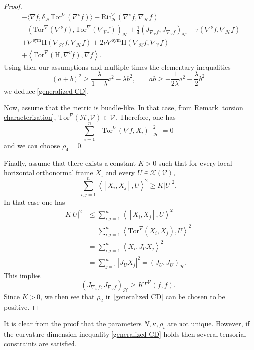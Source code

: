 \documentclass[11pt]{article}
\numberwithin{equation}{section}
\newcommand{\Ho}{\mathcal H}
\newcommand{\V}{\mathcal V}
\newcommand{\Tor}{\mathrm{Tor}}
\begin{document}
\begin{proof}
\begin{align*}
		&- \langle \nabla f, \delta_\Ho \mathrm{Tor}^\nabla ( \nabla^\nu f ) \rangle+\mathrm{Ric}_\Ho^\nabla(\nabla^\nu f, \nabla_{\mathcal{H}} f )\\
		&-(\mathrm{Tor}^\nabla (\nabla^\nu f),\mathrm{Tor}^\nabla (\nabla_\V f) )_\Ho+\frac{1}{4}( J_{\nabla_\V f} , J_{\nabla_\V f} )_\Ho-\tau (\nabla^\nu f,\nabla_\Ho f) \\
        &+ \nabla^{\mathrm{sym}}\mathrm H(\nabla_\Ho f,\nabla_\Ho f)+2\nu \nabla^{\mathrm{sym}}\mathrm H(\nabla_\Ho f,\nabla_\V f) \\
        &+\left\langle \mathrm{Tor}^\nabla (\mathrm H, \nabla^\nu f), \nabla f \right\rangle.
	\end{align*}
    Using then our assumptions and multiple times the elementary inequalities
    \[
(a+b)^2 \ge \frac{\lambda}{1+\lambda}a^2 -\lambda b^2, \qquad ab \ge -\frac{1}{2\lambda} a^2-\frac{\lambda}{2} b^2
\]
we deduce \eqref{generalized CD}. 

Now, assume that the metric is bundle-like. In that case, from Remark \ref{torsion characterization},  $\Tor^\nabla (\Ho,\V) \subset \V$. Therefore, one has
\[
\sum_{i=1}^n\mid \mathrm{Tor}^\nabla(\nabla f, X_i)\mid_\Ho^2=0
\]
and we can choose $\rho_4=0$.

Finally, assume that there exists a constant $K >0$ such that for every local horizontal orthonormal frame $X_i$ and every $U \in \mathcal{X}(\V)$,
\[
\sum_{i,j=1}^n \left\langle [X_i,X_j], U \right\rangle^2 \ge K | U|^2.
\]
In that case one has
\begin{align*}
K |U|^2  & \le   \sum_{i,j=1}^n \left\langle [X_i,X_j], U \right\rangle^2 \\
 & = \sum_{i,j=1}^n \left\langle \Tor^\nabla (X_i,X_j), U \right\rangle^2 \\
 & =\sum_{i,j=1}^n \left\langle X_i , J_U X_j \right\rangle^2 \\
 &=\sum_{j=1}^n |J_U X_j|^2=( J_{U} , J_{U} )_\Ho.
\end{align*}
This implies
\[
( J_{\nabla_\V f} , J_{\nabla_\V f} )_\Ho \ge K \Gamma^\V (f,f).
\]
Since $K>0$, we then see that $\rho_2$ in \eqref{generalized CD} can be chosen to be positive.
    \end{proof}

 It is clear from the proof that the parameters $N,\kappa,\rho_i$ are not unique. However, if the curvature dimension inequality \eqref{generalized CD} holds then several tensorial constraints are satisfied. 
 
\end{document}
